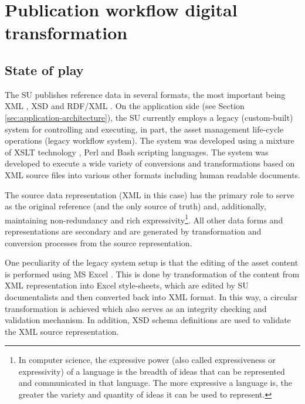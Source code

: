 \section{Publication workflow digital transformation}
\label{sec:context}


	\subsection{State of play}
	The SU publishes reference data in several formats, the most important being XML \citep{xml1-spec}, XSD \citep{xsd1.1-spec} and RDF/XML \citep{rdf-xml-Beckett:04:RSS,rdf-xml-Schreiber:14:RXS}. On the application side (see Section \ref{sec:application-architecture}), the SU currently employs a legacy (custom-built) system for controlling and executing, in part, the asset management life-cycle operations (legacy workflow system). The system was developed using a mixture of XSLT technology \cite{xslt3-Kay}, Perl and Bash scripting languages. The system was developed to execute a wide variety of conversions and transformations based on XML source files into various other formats including human readable documents.
	 
	The source data representation (XML in this case) has the primary role to serve as the original reference (and the only source of truth) and, additionally, maintaining non-redundancy and rich expressivity\footnote{In computer science, the expressive power (also called expressiveness or expressivity) of a language is the breadth of ideas that can be represented and communicated in that language. The more expressive a language is, the greater the variety and quantity of ideas it can be used to represent.}. All other data forms and representations are secondary and are generated by transformation and conversion processes from the source representation.
	 
	One peculiarity of the legacy system setup is that the editing of the asset content is performed using MS Excel \citep{excel}. This is done by transformation of the content from XML representation into Excel style-sheets, which are edited by SU documentalists and then converted back into XML format. In this way, a circular transformation is achieved which also serves as an integrity checking and validation mechanism. In addition, XSD \citep{xsd1.1-spec} schema definitions are used to validate the XML source representation.
	 
